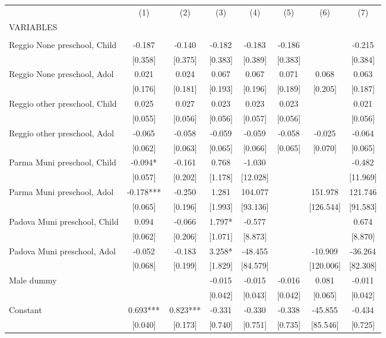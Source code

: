 \begin{tabular}{lccccccc} \hline
 & (1) & (2) & (3) & (4) & (5) & (6) & (7) \\
VARIABLES &  &  &  &  &  &  &  \\ \hline
 &  &  &  &  &  &  &  \\
Reggio None preschool, Child & -0.187 & -0.140 & -0.182 & -0.183 & -0.186 &  & -0.215 \\
 & [0.358] & [0.375] & [0.383] & [0.389] & [0.383] &  & [0.384] \\
Reggio None preschool, Adol & 0.021 & 0.024 & 0.067 & 0.067 & 0.071 & 0.068 & 0.063 \\
 & [0.176] & [0.181] & [0.193] & [0.196] & [0.189] & [0.205] & [0.187] \\
Reggio other preschool, Child & 0.025 & 0.027 & 0.023 & 0.023 & 0.023 &  & 0.021 \\
 & [0.055] & [0.056] & [0.056] & [0.057] & [0.056] &  & [0.056] \\
Reggio other preschool, Adol & -0.065 & -0.058 & -0.059 & -0.059 & -0.058 & -0.025 & -0.064 \\
 & [0.062] & [0.063] & [0.065] & [0.066] & [0.065] & [0.070] & [0.065] \\
Parma Muni preschool, Child & -0.094* & -0.161 & 0.768 & -1.030 &  &  & -0.482 \\
 & [0.057] & [0.202] & [1.178] & [12.028] &  &  & [11.969] \\
Parma Muni preschool, Adol & -0.178*** & -0.250 & 1.281 & 104.077 &  & 151.978 & 121.746 \\
 & [0.065] & [0.196] & [1.993] & [93.136] &  & [126.544] & [91.583] \\
Padova Muni preschool, Child & 0.094 & -0.066 & 1.797* & -0.577 &  &  & 0.674 \\
 & [0.062] & [0.206] & [1.071] & [8.873] &  &  & [8.870] \\
Padova Muni preschool, Adol & -0.052 & -0.183 & 3.258* & -48.455 &  & -10.909 & -36.264 \\
 & [0.068] & [0.199] & [1.829] & [84.579] &  & [120.006] & [82.308] \\
Male dummy &  &  & -0.015 & -0.015 & -0.016 & 0.081 & -0.011 \\
 &  &  & [0.042] & [0.043] & [0.042] & [0.065] & [0.042] \\
Constant & 0.693*** & 0.823*** & -0.331 & -0.330 & -0.338 & -45.855 & -0.434 \\
 & [0.040] & [0.173] & [0.740] & [0.751] & [0.735] & [85.546] & [0.725] \\

\end{tabular}
